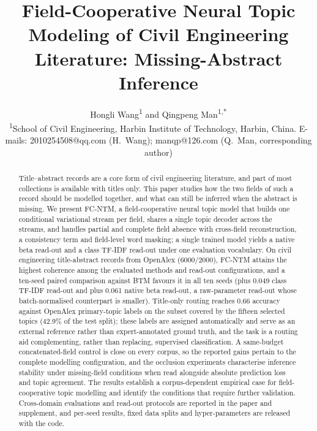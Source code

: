 \documentclass[Journal,letterpaper,NoLists]{ascelike-new}
\begin{document}
\title{Field-Cooperative Neural Topic Modeling of Civil Engineering Literature:
Missing-Abstract Inference}

\author{Hongli Wang\textsuperscript{1} and Qingpeng Man\textsuperscript{1,*}\\[4pt]
\textsuperscript{1}School of Civil Engineering, Harbin Institute of Technology, Harbin, China.
E-mails: 2010254508@qq.com (H.~Wang); manqp@126.com (Q.~Man, corresponding author)}



\maketitle

\begin{abstract}
Title--abstract records are a core form of civil engineering literature, and part of most
collections is available with titles only. This paper studies how the two fields of such a record
should be modelled together, and what can still be inferred when the abstract is missing. We
present FC-NTM, a field-cooperative neural topic model that builds one conditional variational
stream per field, shares a single topic decoder across the streams, and handles partial and
complete field absence with cross-field reconstruction, a consistency term and field-level word
masking; a single trained model yields a native beta read-out and a class TF-IDF read-out under
one evaluation vocabulary. On civil engineering title-abstract records from OpenAlex (6000/2000),
FC-NTM attains the highest coherence among the evaluated methods and read-out configurations, and
a ten-seed paired comparison against BTM favours it in all ten seeds (plus 0.049 class TF-IDF
read-out and plus 0.061 native beta read-out, a raw-parameter read-out whose batch-normalised
counterpart is smaller). Title-only routing reaches 0.66 accuracy against OpenAlex primary-topic labels on the subset
covered by the fifteen selected topics (42.9\% of the test split); these labels are assigned
automatically and serve as an external reference rather than expert-annotated ground truth, and
the task is a routing aid complementing, rather than replacing, supervised classification. A same-budget concatenated-field control is close on
every corpus, so the reported gains pertain to the complete modelling configuration, and the
occlusion experiments characterise inference stability under missing-field conditions when read
alongside absolute prediction loss and topic agreement. The results establish a corpus-dependent
empirical case for field-cooperative topic modelling and identify the conditions that require
further validation. Cross-domain evaluations and read-out protocols are reported in the paper and
supplement, and per-seed results, fixed data splits and hyper-parameters are released with the
code.
\end{abstract}
\end{document}
